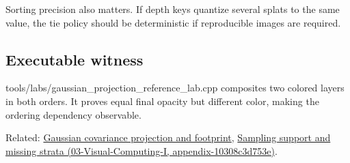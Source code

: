 Sorting precision also matters. If depth keys quantize several splats to the same value, the tie policy should be deterministic if reproducible images are required.

\subsection{Executable witness}\label{appendix-5f4b2e24c3f6-executable-witness}

tools/labs/gaussian\_projection\_reference\_lab.cpp composites two colored layers in both orders. It proves equal final opacity but different color, making the ordering dependency observable.

Related: \hyperref[appendix-24269cb6977c]{Gaussian covariance projection and footprint}, \href{../03-Visual-Computing-I/main.pdf\#nameddest=appendix-10308c3d753e}{Sampling support and missing strata (03-Visual-Computing-I, appendix-10308c3d753e)}.

